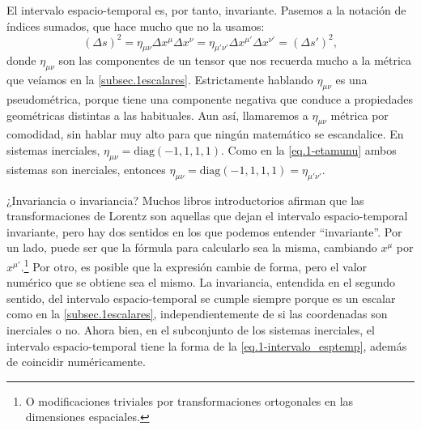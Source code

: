 El intervalo espacio-temporal es, por tanto, invariante. Pasemos a la notación de índices sumados, que hace mucho que no la usamos:
\begin{equation}
    \label{eq.1-etamunu}
    \left(\Delta s\right)^2 = \eta_{\mu\nu}\Delta x^\mu \Delta x^\nu = \eta_{\mu'\nu'}\Delta x^{\mu'} \Delta x^{\nu'} = \left(\Delta s'\right)^2,
\end{equation}
donde \(\eta_{\mu\nu}\) son las componentes de un tensor que nos recuerda mucho a la métrica que veíamos en la \cref{subsec.1escalares}. Estrictamente hablando \(\eta_{\mu\nu}\) es una pseudométrica, porque tiene una componente negativa que conduce a propiedades geométricas distintas a las habituales. Aun así, llamaremos a \(\eta_{\mu\nu}\) métrica por comodidad, sin hablar muy alto para que ningún matemático se escandalice. En sistemas inerciales, \(\eta_{\mu\nu} = \text{diag}(-1, 1, 1, 1)\). Como en la \cref{eq.1-etamunu} ambos sistemas son inerciales, entonces \(\eta_{\mu\nu} = \text{diag}(-1, 1, 1, 1) = \eta_{\mu'\nu'}\).

\begin{observation}
    {¿Invariancia o invariancia?}
    \label{obs.1-invariancia}
    Muchos libros introductorios afirman que las transformaciones de Lorentz son aquellas que dejan el intervalo espacio-temporal invariante, pero hay dos sentidos en los que podemos entender ``invariante''. Por un lado, puede ser que la fórmula para calcularlo sea la misma, cambiando \(x^\mu\) por \(x^{\mu'}\).\footnote{O modificaciones triviales por transformaciones ortogonales en las dimensiones espaciales.} Por otro, es posible que la expresión cambie de forma, pero el valor numérico que se obtiene sea el mismo. La invariancia, entendida en el segundo sentido, del intervalo espacio-temporal se cumple siempre porque es un escalar como en la \cref{subsec.1escalares}, independientemente de si las coordenadas son inerciales o no. Ahora bien, en el subconjunto de los sistemas inerciales, el intervalo espacio-temporal tiene la forma de la \cref{eq.1-intervalo_esptemp}, además de coincidir numéricamente.
\end{observation}

